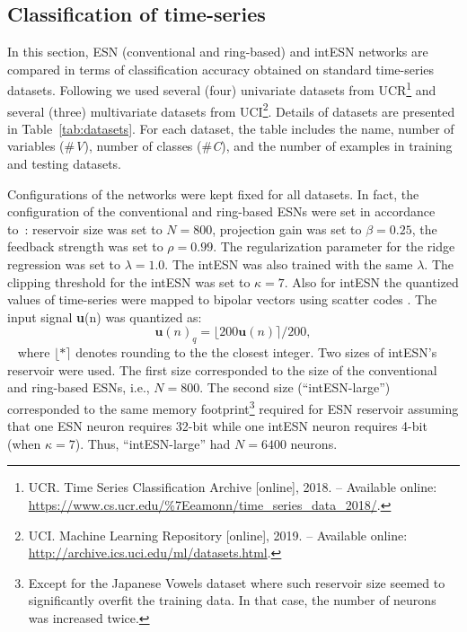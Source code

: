 \subsection{Classification of time-series}

In this section, ESN (conventional and ring-based) and intESN networks are compared in terms of classification accuracy obtained on standard time-series datasets. 
Following \cite{Bianchi2018} we used several (four) univariate datasets from UCR\footnote{UCR. Time Series Classification Archive [online], 2018. -- Available online: \url{https://www.cs.ucr.edu/\%7Eeamonn/time\_series\_data\_2018/}.}  and several (three) multivariate datasets from UCI\footnote{UCI. Machine Learning Repository [online], 2019. -- Available online: \url{http://archive.ics.uci.edu/ml/datasets.html}.}.
Details of datasets are presented in Table~\ref{tab:datasets}. 
For each dataset, the table includes the name, number of variables (\#\textit{V}), number of classes (\#\textit{C}), and the number of examples in training and testing datasets.  






Configurations of the networks were kept fixed for all datasets. 
In fact, the configuration of the conventional and ring-based ESNs were set in accordance to~\cite{Bianchi2018}: 
reservoir size was set to $N=800$, projection gain was set to $\beta=0.25$, the feedback strength was set to $\rho=0.99$. 
The regularization parameter for the ridge regression was set to $\lambda=1.0$.
The intESN was also trained with the same $\lambda$.
The clipping threshold for the intESN  was set to $\kappa=7$. 
Also for intESN the quantized values of time-series were mapped to bipolar vectors using scatter codes \cite{TNNLS18, scatter}. 
The input signal \textbf{u}(n) was quantized as:
~
\begin{equation}
\textbf{u}(n)_q= \lfloor 200\textbf{u}(n) \rceil /200,
\label{eq:quan:timeser}
 \end{equation}
~
where $\lfloor * \rceil$ denotes rounding to the the closest integer. 
Two sizes of intESN's reservoir were used. The first size corresponded to the size of the conventional and ring-based ESNs, i.e., $N=800$. The second size (``intESN-large'') corresponded to the same memory footprint\footnote{Except for the Japanese Vowels dataset where such reservoir size seemed to significantly overfit the training data. In that case, the number of neurons was increased twice.} required for ESN reservoir assuming that one ESN neuron requires 32-bit while one intESN neuron requires 4-bit (when $\kappa=7$). 
Thus, ``intESN-large'' had  $N=6400$ neurons. 




